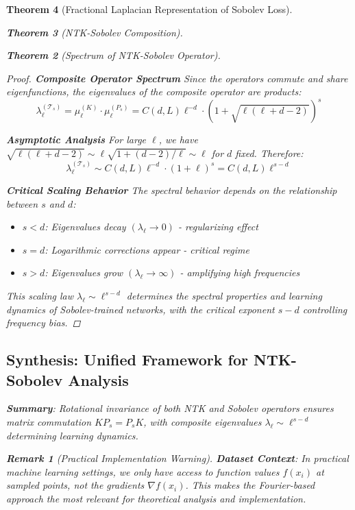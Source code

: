 \documentclass{article}
\newtheorem{theorem}{Theorem}[section]
\newtheorem{remark}[theorem]{Remark}
\begin{document}
\begin{theorem}[Fractional Laplacian Representation of Sobolev Loss]
\begin{theorem}[NTK-Sobolev Composition]
\begin{theorem}[Spectrum of NTK-Sobolev Operator]
\begin{proof}
\textbf{Composite Operator Spectrum}
Since the operators commute and share eigenfunctions, the eigenvalues of the composite operator are products:
\[ \lambda_\ell^{(\mathcal{T}_s)} = \mu_\ell^{(K)} \cdot \mu_\ell^{(P_s)} = C(d, L) \ell^{-d} \cdot (1 + \sqrt{\ell(\ell + d - 2)})^s \]

\textbf{Asymptotic Analysis}
For large $\ell$, we have $\sqrt{\ell(\ell + d - 2)} \sim \ell \sqrt{1 + (d-2)/\ell} \sim \ell$ for $d$ fixed. Therefore:
\[ \lambda_\ell^{(\mathcal{T}_s)} \sim C(d, L) \ell^{-d} \cdot (1 + \ell)^s = C(d, L) \ell^{s-d} \]

\textbf{Critical Scaling Behavior}
The spectral behavior depends on the relationship between $s$ and $d$:
\begin{itemize}
\item $s < d$: Eigenvalues decay $(\lambda_\ell \to 0)$ - regularizing effect
\item $s = d$: Logarithmic corrections appear - critical regime  
\item $s > d$: Eigenvalues grow $(\lambda_\ell \to \infty)$ - amplifying high frequencies
\end{itemize}

This scaling law $\lambda_\ell \sim \ell^{s-d}$ determines the spectral properties and learning dynamics of Sobolev-trained networks, with the critical exponent $s - d$ controlling frequency bias.
\end{proof}

\subsection{Synthesis: Unified Framework for NTK-Sobolev Analysis}

\textbf{Summary}: Rotational invariance of both NTK and Sobolev operators ensures matrix commutation $KP_s = P_sK$, with composite eigenvalues $\lambda_\ell \sim \ell^{s-d}$ determining learning dynamics.

\begin{remark}[Practical Implementation Warning]
\textbf{Dataset Context}: In practical machine learning settings, we only have access to function values $f(x_i)$ at sampled points, \emph{not} the gradients $\nabla f(x_i)$. This makes the Fourier-based approach the most relevant for theoretical analysis and implementation.


\end{remark}
\end{theorem}
\end{theorem}
\end{theorem}
\end{document}
